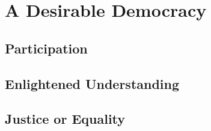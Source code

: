 
\chapter[Desirable Democracy]{A Desirable Democracy} \label{chap:desirable-democracy}

\section{Participation}

\section{Enlightened Understanding}

\section{Justice or Equality}



